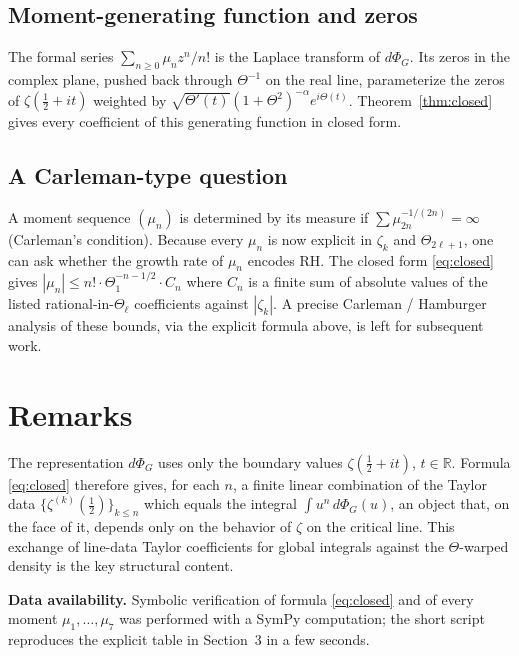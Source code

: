 \documentclass[11pt]{amsart}
\theoremstyle{definition}
\begin{document}
\subsection{Moment-generating function and zeros}
The formal series $\sum_{n\ge 0}\mu_n z^n/n!$ is the Laplace transform of
$d\Phi_G$.  Its zeros in the complex plane, pushed back through $\Theta^{-1}$
on the real line, parameterize the zeros of $\zeta(\tfrac12+it)$ weighted by
$\sqrt{\Theta'(t)}(1+\Theta^2)^{-\alpha}e^{i\Theta(t)}$.
Theorem~\ref{thm:closed} gives every coefficient of this generating function in
closed form.

\subsection{A Carleman-type question}
A moment sequence $(\mu_n)$ is determined by its measure if
$\sum\mu_{2n}^{-1/(2n)}=\infty$ (Carleman's condition).
Because every $\mu_n$ is now explicit in $\zeta_k$ and $\Theta_{2\ell+1}$,
one can ask whether the growth rate of $\mu_n$ encodes RH.
The closed form \eqref{eq:closed} gives
$|\mu_n|\le n!\cdot \Theta_1^{-n-1/2}\cdot C_n$ where $C_n$ is a finite sum of
absolute values of the listed rational-in-$\Theta_\ell$ coefficients against
$|\zeta_{k}|$.  A precise Carleman / Hamburger analysis of these bounds, via
the explicit formula above, is left for subsequent work.

\section{Remarks}

The representation $d\Phi_G$ uses only the boundary values
$\zeta(\tfrac12+it)$, $t\in\mathbb{R}$.  Formula \eqref{eq:closed} therefore
gives, for each $n$, a finite linear combination of the Taylor data
$\{\zeta^{(k)}(\tfrac12)\}_{k\le n}$ which equals the integral $\int u^n\,d\Phi_G(u)$,
an object that, on the face of it, depends only on the behavior of $\zeta$ on
the critical line.  This exchange of line-data Taylor coefficients for global
integrals against the $\Theta$-warped density is the key structural content.

\bigskip
\noindent\textbf{Data availability.}
Symbolic verification of formula \eqref{eq:closed} and of every moment
$\mu_1,\ldots,\mu_7$ was performed with a SymPy computation; the short script
reproduces the explicit table in Section~3 in a few seconds.
\end{document}
